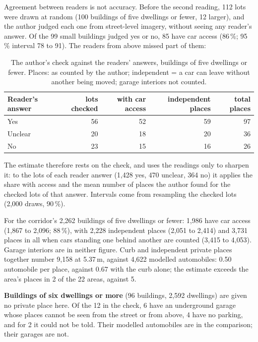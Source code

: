\documentclass[11pt,a4paper]{article}
\begin{document}
Agreement between readers is not accuracy. Before the second reading, 112 lots were drawn at random (100 buildings of five dwellings or fewer, 12 larger), and the author judged each one from street-level imagery, without seeing any reader\textquoteright{}s answer. Of the 99 small buildings judged yes or no, 85 have car access (86\,\%; 95\,\% interval 78 to 91). The readers from above missed part of them:
\begin{table}[H]\centering\small
\caption{The author\textquoteright{}s check against the readers\textquoteright{} answers, buildings of five dwellings or fewer. Places: as counted by the author; independent = a car can leave without another being moved; garage interiors not counted.}
\begin{tabular}{@{}lrrrr@{}}\toprule
Reader\textquoteright{}s answer & lots checked & with car access & independent places & total places \\\midrule
Yes & 56 & 52 & 59 & 97 \\
Unclear & 20 & 18 & 20 & 36 \\
No & 23 & 15 & 16 & 26 \\
\bottomrule\end{tabular}\end{table}
The estimate therefore rests on the check, and uses the readings only to sharpen it: to the lots of each reader answer (1{,}428 yes, 470 unclear, 364 no) it applies the share with access and the mean number of places the author found for the checked lots of that answer. Intervals come from resampling the checked lots (2{,}000 draws, 90\,\%).

For the corridor\textquoteright{}s 2{,}262 buildings of five dwellings or fewer: 1{,}986 have car access (1{,}867 to 2{,}096; 88\,\%), with 2{,}228 independent places (2{,}051 to 2{,}414) and 3{,}731 places in all when cars standing one behind another are counted (3{,}415 to 4{,}053). Garage interiors are in neither figure. Curb and independent private places together number 9{,}158 at 5.37\,m, against 4{,}622 modelled automobiles: 0.50 automobile per place, against 0.67 with the curb alone; the estimate exceeds the area\textquoteright{}s places in 2 of the 22 areas, against 5.

\textbf{Buildings of six dwellings or more} (96 buildings, 2{,}592 dwellings) are given no private place here. Of the 12 in the check, 6 have an underground garage whose places cannot be seen from the street or from above, 4 have no parking, and for 2 it could not be told. Their modelled automobiles are in the comparison; their garages are not.
\end{document}
